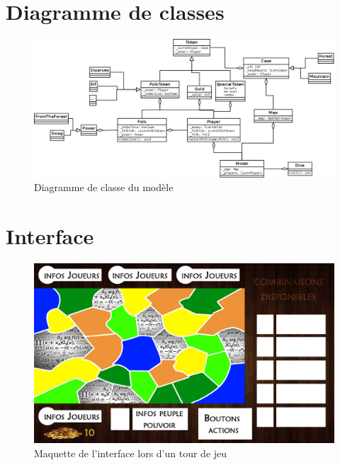 \documentclass[a4paper]{report}
\begin{document}
\section{Diagramme de classes}
\begin{figure}[H]
    \begin{center}
        \includegraphics[width=0.85\textheight,angle=90]{classe.png}
        \caption{Diagramme de classe du modèle}
    \end{center}
\end{figure}
\section{Interface}
\begin{figure}[H]
    \begin{center}
        \includegraphics[width=0.85\textheight,angle=90]{plateau.jpg}
        \caption{Maquette de l'interface lors d'un tour de jeu}
   \end{center}
\end{figure}
\end{document}
